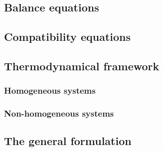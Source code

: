 \subsection{Balance equations}
\subsection{Compatibility equations}
\subsection{Thermodynamical framework}
\subsubsection{Homogeneous systems}
\subsubsection{Non-homogeneous systems}
\subsection{The general formulation}





